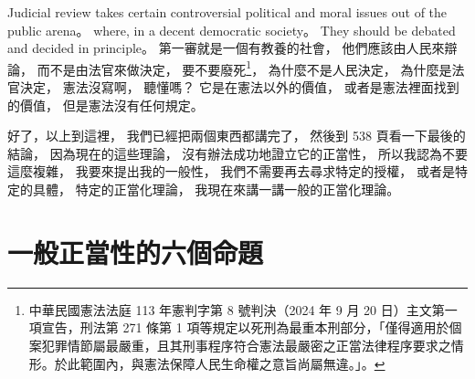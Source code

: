 \hypertarget{w02:cue:2402}{}Judicial review takes certain controversial political and moral issues out of the public arena。
\hypertarget{w02:cue:2403}{}where, in a decent democratic society。
\hypertarget{w02:cue:2404}{}They should be debated and decided in principle。
\hypertarget{w02:cue:2405}{}第一審就是一個有教養的社會，
\hypertarget{w02:cue:2406}{}他們應該由人民來辯論，
\hypertarget{w02:cue:2407}{}而不是由法官來做決定，
\hypertarget{w02:cue:2408}{}要不要廢死\footnote{中華民國憲法法庭 113 年憲判字第 8 號判決（2024 年 9 月 20 日）主文第一項宣告，刑法第 271 條第 1 項等規定以死刑為最重本刑部分，「僅得適用於個案犯罪情節屬最嚴重，且其刑事程序符合憲法最嚴密之正當法律程序要求之情形。於此範圍內，與憲法保障人民生命權之意旨尚屬無違。」\cite{ccj113-8}。}，
\hypertarget{w02:cue:2409}{}為什麼不是人民決定，
\hypertarget{w02:cue:2410}{}為什麼是法官決定，
\hypertarget{w02:cue:2411}{}憲法沒寫啊，
\hypertarget{w02:cue:2412}{}聽懂嗎？
\hypertarget{w02:cue:2413}{}它是在憲法以外的價值，
\hypertarget{w02:cue:2414}{}或者是憲法裡面找到的價值，
\hypertarget{w02:cue:2415}{}但是憲法沒有任何規定。

\hypertarget{w02:cue:2416}{}好了，以上到這裡，
\hypertarget{w02:cue:2417}{}我們已經把兩個東西都講完了，
\hypertarget{w02:cue:2418}{}然後到 538 頁看一下最後的結論，
\hypertarget{w02:cue:2419}{}因為現在的這些理論，
\hypertarget{w02:cue:2420}{}沒有辦法成功地證立它的正當性，
\hypertarget{w02:cue:2421}{}所以我認為不要這麼複雜，
\hypertarget{w02:cue:2422}{}我要來提出我的一般性，
\hypertarget{w02:cue:2423}{}我們不需要再去尋求特定的授權，
\hypertarget{w02:cue:2424}{}或者是特定的具體，
\hypertarget{w02:cue:2425}{}特定的正當化理論，
\hypertarget{w02:cue:2426}{}我現在來講一講一般的正當化理論。

\section{一般正當性的六個命題}

